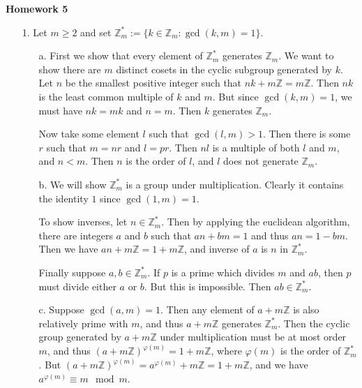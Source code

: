 \documentclass[11pt, reqno]{article}
\theoremstyle{plain}
\theoremstyle{definition}
\theoremstyle{remark}
\renewcommand{\phi}{\varphi}
\newcommand{\ZZ}{\mathbb{Z}}
\begin{document}
\topmargin=-40pt
\renewcommand{\headrulewidth}{1pt}
\renewcommand{\headsep}{20pt}
\thispagestyle{fancy}

{\Huge \bfseries \noindent Homework 5}

\begin{enumerate}
    \item[1.] Let $m \geq 2$ and set $\ZZ_m^* := \{k \in \ZZ_m: \gcd(k,m) = 1\}$.
    \begin{enumerate}
        \item[a.] First we show that every element of $\ZZ_m^*$ generates 
        $\ZZ_m$. We want to show there are $m$ distinct cosets in the cyclic subgroup generated by $k$.
        Let $n$ be the smallest positive integer such that $nk + m\ZZ = m\ZZ$. 
        Then $nk$ is the least common multiple of $k$ and $m$. But since $\gcd(k,m) = 1$, 
        we must have $nk = mk$ and $n = m$. Then $k$ generates $\ZZ_m$.

        Now take some element $l$ such that $\gcd(l,m) > 1$. Then there is some $r$ such that 
        $m = nr$ and $l = pr$. Then $nl$ is a multiple of both $l$ and $m$, and $n < m$. Then
        $n$ is the order of $l$, and $l$ does not generate $\ZZ_m$.

        \item[b.] We will show $\ZZ_m^*$ is a group under multiplication. Clearly it contains the
        identity $1$ since $\gcd(1,m) = 1$. 

        To show inverses, let $n \in \ZZ_m^*$. Then by applying the euclidean algorithm, there
        are integers $a$ and $b$ such that $an + bm = 1$ and thus $an = 1 - bm$. 
        Then we have $an + m\ZZ = 1 + m\ZZ$, and
        inverse of $a$ is $n$ in $\ZZ_m^*$. 

        Finally suppose $a, b \in \ZZ_m^*$. If $p$ is a prime which divides $m$ and $ab$, then 
        $p$ must divide either $a$ or $b$. But this is impossible. Then $ab \in \ZZ_m^*$.

        \item[c.] Suppose $\gcd(a,m) = 1$. Then any element of $a + m\ZZ$ is also relatively prime 
        with $m$, and thus $a + m\ZZ$ generates $\ZZ_m^*$. Then the cyclic group generated by 
        $a + m\ZZ$ under multiplication must be at most order $m$, and thus $(a + m\ZZ)^{\phi(m)} = 1 + m\ZZ$,
        where $\phi(m)$ is the order of $\ZZ_m^*$. But $(a + m\ZZ)^{\phi(m)} = a^{\phi(m)} + m\ZZ = 1 + m\ZZ$,
        and we have $a^{\phi(m)} \equiv m\mod m$.


\end{enumerate}
\end{enumerate}
\end{document}
